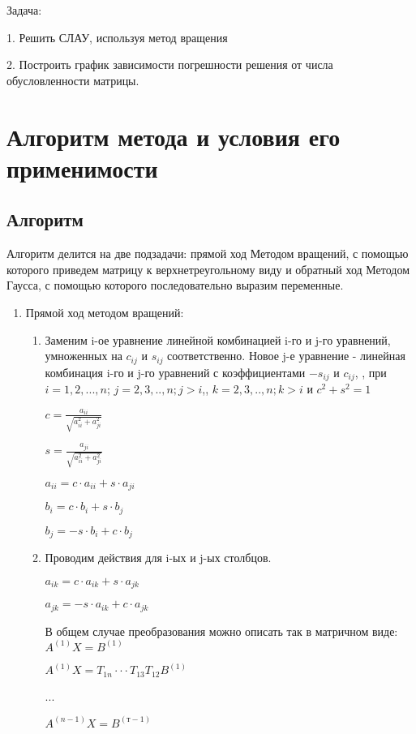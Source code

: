 \documentclass{article}
\begin{document}
	Задача:
	
	1. Решить СЛАУ, используя метод вращения
	
	2. Построить график зависимости погрешности решения от числа обусловленности матрицы.
	\section{Алгоритм метода и условия его применимости}   
	\subsection{Алгоритм}
	Алгоритм делится на две подзадачи: прямой ход Методом вращений, с помощью которого приведем матрицу к верхнетреугольному виду и обратный ход Методом Гаусса, с помощью которого последовательно выразим переменные.
		\begin{enumerate}
			\item Прямой ход методом вращений:
			\begin{enumerate}
				
				\item Заменим i-ое уравнение линейной комбинацией	i-го и j-го уравнений, умноженных на $c_{ij}$ и $s_{ij}$ соответственно. Новое j-е уравнение - линейная комбинация i-го и j-го уравнений с коэффициентами $-s_{ij}$ и $c_{ij}$, , при $i = 1, 2,...,n$; $j = 2, 3,..,n; j > i$,, $k = 2, 3,..,n; k > i$ и $c^2 + s^2 = 1$
				
				$c = \frac{a_{ii}}{\sqrt{a_{ii}^2 + a_{ji}^2}}$
				
				$s = \frac{a_{ji}}{\sqrt{a_{ii}^2 + a_{ji}^2}}$
				
				$a_{ii} = c\cdot a_{ii} + s \cdot a_{ji} $
				
				$b_{i} = c\cdot b_{i} + s \cdot b_{j} $
				
				$b_{j} = -s\cdot b_{i} + c \cdot b_{j} $
				
				\item  Проводим действия для i-ых и j-ых столбцов.
				
				$a_{ik} = c\cdot a_{ik} + s \cdot a_{jk} $
				
				$a_{jk} = -s\cdot a_{ik} + c \cdot a_{jk} $
				
			В общем случае преобразования можно описать так в матричном виде:
				$A^{(1)}X = B^{(1)}$
				
				$A^{(1)}X = T_{1n}\cdot\cdot\cdot T_{13}T_{12}B^{(1)}$
				
				...
				
				$A^{(n-1)}X = B^{(т-1)} $
				

\end{enumerate}
\end{enumerate}
\end{document}
